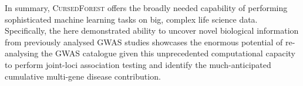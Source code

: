 \documentclass[10pt,letterpaper]{article}
\newcommand{\cursedforest}{\textsc{CursedForest}\xspace}
\begin{document}
In summary, \cursedforest  offers the broadly needed capability of performing sophisticated machine learning tasks on big, complex life science data. Specifically, the here demonstrated ability to uncover novel biological information from previously analysed GWAS studies showcases the enormous potential of re-analysing the GWAS catalogue given this unprecedented computational capacity to perform joint-loci association testing and identify the much-anticipated cumulative multi-gene disease contribution.    

%
%
%
%
%
\end{document}
